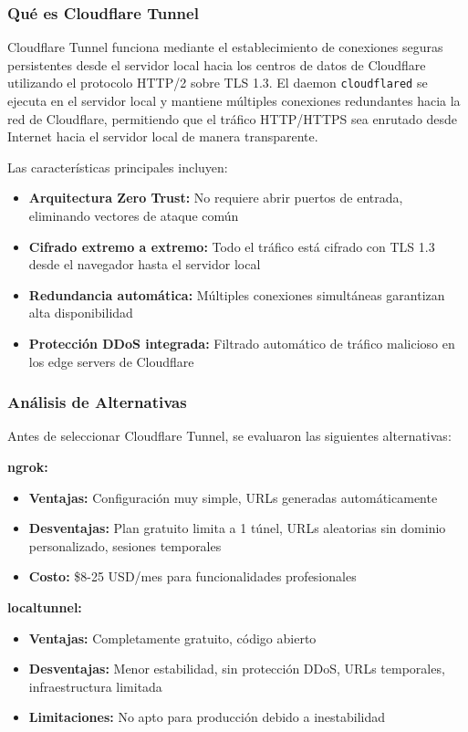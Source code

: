 \documentclass[12pt,a4paper]{report}
\begin{document}
\subsubsection{Qué es Cloudflare Tunnel}

Cloudflare Tunnel funciona mediante el establecimiento de conexiones seguras persistentes desde el servidor local hacia los centros de datos de Cloudflare utilizando el protocolo HTTP/2 sobre TLS 1.3. El daemon \texttt{cloudflared} se ejecuta en el servidor local y mantiene múltiples conexiones redundantes hacia la red de Cloudflare, permitiendo que el tráfico HTTP/HTTPS sea enrutado desde Internet hacia el servidor local de manera transparente.

Las características principales incluyen:
\begin{itemize}
\item \textbf{Arquitectura Zero Trust:} No requiere abrir puertos de entrada, eliminando vectores de ataque común
\item \textbf{Cifrado extremo a extremo:} Todo el tráfico está cifrado con TLS 1.3 desde el navegador hasta el servidor local
\item \textbf{Redundancia automática:} Múltiples conexiones simultáneas garantizan alta disponibilidad
\item \textbf{Protección DDoS integrada:} Filtrado automático de tráfico malicioso en los edge servers de Cloudflare
\end{itemize}

\subsubsection{Análisis de Alternativas}

Antes de seleccionar Cloudflare Tunnel, se evaluaron las siguientes alternativas:

\textbf{ngrok:}
\begin{itemize}
\item \textbf{Ventajas:} Configuración muy simple, URLs generadas automáticamente
\item \textbf{Desventajas:} Plan gratuito limita a 1 túnel, URLs aleatorias sin dominio personalizado, sesiones temporales
\item \textbf{Costo:} \$8-25 USD/mes para funcionalidades profesionales
\end{itemize}

\textbf{localtunnel:}
\begin{itemize}
\item \textbf{Ventajas:} Completamente gratuito, código abierto
\item \textbf{Desventajas:} Menor estabilidad, sin protección DDoS, URLs temporales, infraestructura limitada
\item \textbf{Limitaciones:} No apto para producción debido a inestabilidad
\end{itemize}
\end{document}
